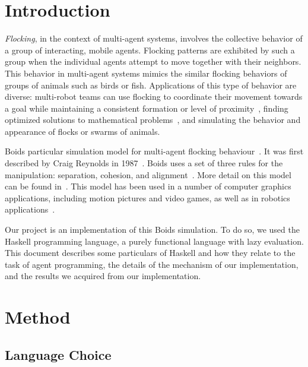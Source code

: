 



\MYHEADERS{}

\section{Introduction}
    \textit{Flocking}, in the context of multi-agent systems, involves the collective behavior of a group of interacting, mobile agents. Flocking patterns are exhibited by such a group when the individual agents attempt to move together with their neighbors. This behavior in multi-agent systems mimics the similar flocking behaviors of groups of animals such as birds or fish. Applications of this type of behavior are diverse: multi-robot teams can use flocking to coordinate their movement towards a goal while maintaining a consistent formation or level of proximity~\cite{saska2014swarms,min2011design}, finding optimized solutions to mathematical problems~\cite{cui2009boid}, and simulating the behavior and appearance of flocks or swarms of animals.%
    \par Boids particular simulation model for multi-agent flocking behaviour~\cite{hartman2006autonomous}. It was first described by Craig Reynolds in 1987~\cite{reynolds1987flocks}. Boids uses a set of three rules for the manipulation: separation, cohesion, and alignment~\cite{reynolds1987flocks,hartman2006autonomous}. More detail on this model can be found in~. This model has been used in a number of computer graphics applications, including motion pictures and video games, as well as in robotics applications~\cite{saska2014swarms,min2011design}.
    \par Our project is an implementation of this Boids simulation. To do so, we used the Haskell programming language, a purely functional language with lazy evaluation. This document describes some particulars of Haskell and how they relate to the task of agent programming, the details of the mechanism of our implementation, and the results we acquired from our implementation.

\section{Method}
\subsection{Language Choice}

